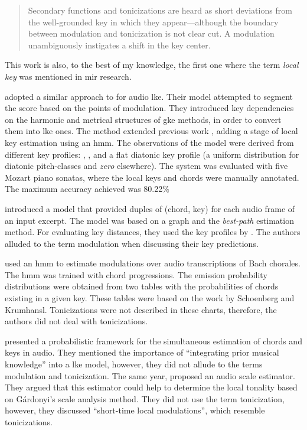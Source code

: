 \begin{quote}
    Secondary functions and tonicizations are heard as short
    deviations from the well-grounded key in which they
    appear---although the boundary between modulation and
    tonicization is not clear cut. A modulation
    unambiguously instigates a shift in the key center.
\end{quote}

This work is also, to the best of my knowledge, the first
one where the term \emph{local key} was mentioned in
\gls{mir} research.

\textcite{papadopoulos2009local} adopted a similar approach
to \textcite{izmirli2007localized} for audio \gls{lke}.
Their model attempted to segment the score based on the
points of modulation. They introduced key dependencies on
the harmonic and metrical structures of \gls{gke} methods,
in order to convert them into \gls{lke} ones. The method
extended previous work
\parencite{papadopoulos2008simultaneous}, adding a stage of
local key estimation using an \gls{hmm}. The observations of
the model were derived from different key profiles:
\textcite{krumhansl1982tracing},
\textcite{temperley1999whats}, and a flat diatonic key
profile (a uniform distribution for diatonic pitch-classes
and \emph{zero} elsewhere). The system was evaluated with
five Mozart piano sonatas, where the local keys and chords
were manually annotated. The maximum accuracy achieved was
80.22\%

\textcite{rocher2010concurrent} introduced a model that
provided duples of (chord, key) for each audio frame of an
input excerpt. The model was based on a graph and the
\emph{best-path} estimation method. For evaluating key
distances, they used the key profiles by
\textcite{temperley1999whats}. The authors alluded to the
term modulation when discussing their key predictions.

\textcite{mearns2011automatically} used an \gls{hmm} to
estimate modulations over audio transcriptions of Bach
chorales. The \gls{hmm} was trained with chord progressions.
The emission probability distributions were obtained from
two tables with the probabilities of chords existing in a
given key. These tables were based on the work by Schoenberg
and Krumhansl. Tonicizations were not described in these
charts, therefore, the authors did not deal with
tonicizations.


\textcite{pauwels2014combining} presented a probabilistic
framework for the simultaneous estimation of chords and keys
in audio. They mentioned the importance of ``integrating
prior musical knowledge'' into a \gls{lke} model, however,
they did not allude to the terms modulation and
tonicization. The same year, \textcite{weis2014chromabased}
proposed an audio scale estimator. They argued that this
estimator could help to determine the local tonality based
on G\'{a}rdonyi's scale analysis method. They did not use
the term tonicization, however, they discussed ``short-time
local modulations'', which resemble tonicizations.

